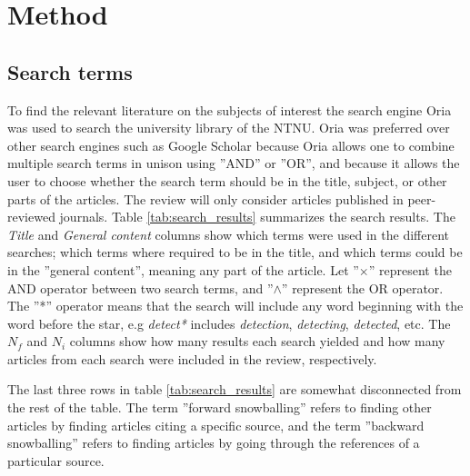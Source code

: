 \newpage
\chapter{Method}

\section{Search terms}
To find the relevant literature on the subjects of interest the search engine Oria was used to search the university library of the NTNU. Oria was preferred over other search engines such as Google Scholar because Oria allows one to combine multiple search terms in unison using ''AND'' or ''OR'', and because it allows the user to choose whether the search term should be in the title, subject, or other parts of the articles. The review will only consider articles published in peer-reviewed journals. Table \ref{tab:search_results} summarizes the search results. The \textit{Title} and \textit{General content} columns show which terms were used in the different searches; which terms where required to be in the title, and which terms could be in the ''general content'', meaning any part of the article. Let ''$\times$'' represent the AND operator between two search terms, and ''$\wedge$'' represent the OR operator. The ''*'' operator means that the search will include any word beginning with the word before the star, e.g \textit{detect*} includes \textit{detection}, \textit{detecting}, \textit{detected}, etc. The $N_f$ and $N_i$ columns show how many results each search yielded and how many articles from each search were included in the review, respectively. \bigskip 

The last three rows in table \ref{tab:search_results} are somewhat disconnected from the rest of the table. The term ''forward snowballing'' refers to finding other articles by finding articles citing a specific source, and the term ''backward snowballing'' refers to finding articles by going through the references of a particular source.

